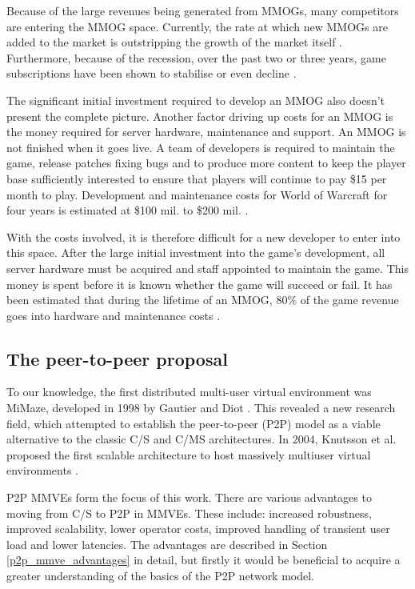 Because of the large revenues being generated from MMOGs, many competitors are entering the MMOG space. Currently, the rate at which new MMOGs are added to the market is outstripping the growth of the market itself \cite{newzoo_mmo_report}. Furthermore, because of the recession, over the past two or three years, game subscriptions have been shown to stabilise or even decline \cite{mmo_growth_chart}.

The significant initial investment required to develop an MMOG also doesn't present the complete picture. Another factor driving up costs for an MMOG is the money required for server hardware, maintenance and support. An MMOG is not finished when it goes live. A team of developers is required to maintain the game, release patches fixing bugs and to produce more content to keep the player base sufficiently interested to ensure that players will continue to pay \$15 per month to play. Development and maintenance costs for World of Warcraft for four years is estimated at \$100 mil. to \$200 mil. \cite{wow_cost}.

With the costs involved, it is therefore difficult for a new developer to enter into this space. After the large initial investment into the game's development, all server hardware must be acquired and staff appointed to maintain the game. This money is spent before it is known whether the game will succeed or fail. It has been estimated that during the lifetime of an MMOG, 80\% of the game revenue goes into hardware and maintenance costs \cite{cs_mmog_cost}.

\subsection{The peer-to-peer proposal}

To our knowledge, the first distributed multi-user virtual environment was MiMaze, developed in 1998 by Gautier and Diot \cite{mimaze}. This revealed a new research field, which attempted to establish the peer-to-peer (P2P) model as a viable alternative to the classic C/S and C/MS architectures. In 2004, Knutsson et al. proposed the first scalable architecture to host massively multiuser virtual environments  \cite{knutsson_p2p_first}.

P2P MMVEs form the focus of this work. There are various advantages to moving from C/S to P2P in MMVEs. These include: increased robustness, improved scalability, lower operator costs, improved handling of transient user load and lower latencies. The advantages are described in Section \ref{p2p_mmve_advantages} in detail, but firstly it would be beneficial to acquire a greater understanding of the basics of the P2P network model.

